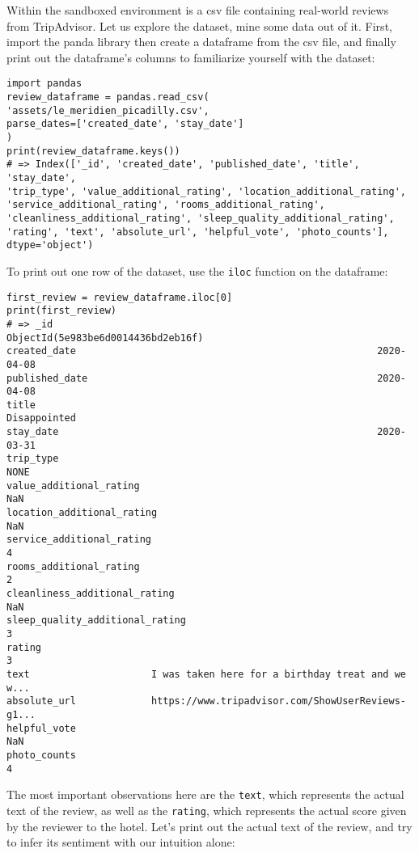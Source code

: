 	Within the sandboxed environment is a csv file containing real-world reviews from TripAdvisor. Let us explore the dataset, mine some data out of it. First, import the panda library then create a dataframe from the csv file, and finally print out the dataframe's columns to familiarize yourself with the dataset:
	\begin{Verbatim}
import pandas
review_dataframe = pandas.read_csv(
'assets/le_meridien_picadilly.csv',
parse_dates=['created_date', 'stay_date']
)
print(review_dataframe.keys())
# => Index(['_id', 'created_date', 'published_date', 'title', 'stay_date',
'trip_type', 'value_additional_rating', 'location_additional_rating',
'service_additional_rating', 'rooms_additional_rating',
'cleanliness_additional_rating', 'sleep_quality_additional_rating',
'rating', 'text', 'absolute_url', 'helpful_vote', 'photo_counts'],
dtype='object')
	\end{Verbatim}
	To print out one row of the dataset, use the \verb|iloc| function on the dataframe:
	\begin{Verbatim}
first_review = review_dataframe.iloc[0]
print(first_review)
# => _id                                     ObjectId(5e983be6d0014436bd2eb16f)
created_date                                                    2020-04-08
published_date                                                  2020-04-08
title                                                         Disappointed
stay_date                                                       2020-03-31
trip_type                                                             NONE
value_additional_rating                                                NaN
location_additional_rating                                             NaN
service_additional_rating                                                4
rooms_additional_rating                                                  2
cleanliness_additional_rating                                          NaN
sleep_quality_additional_rating                                          3
rating                                                                   3
text                     I was taken here for a birthday treat and we w...
absolute_url             https://www.tripadvisor.com/ShowUserReviews-g1...
helpful_vote                                                           NaN
photo_counts                                                             4
	\end{Verbatim}
	The most important observations here are the \verb|text|, which represents the actual text of the review, as well as the \verb|rating|, which represents the actual score given by the reviewer to the hotel. Let's print out the actual text of the review, and try to infer its sentiment with our intuition alone:

